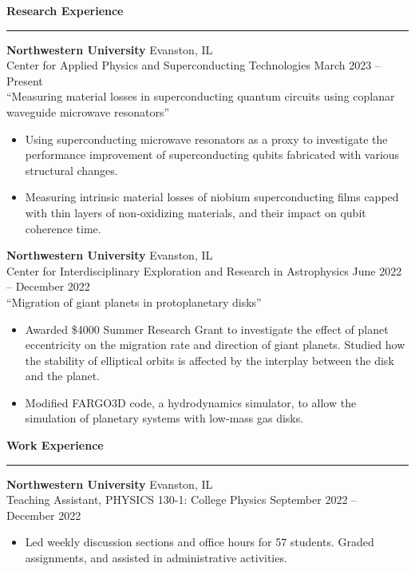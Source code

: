 \documentclass{article}
\begin{document}
\large \textbf{Research Experience}
\vspace{0.2\baselineskip}
\hrule\normalsize
\textbf{Northwestern University} \hfill Evanston, IL \\
Center for Applied Physics and Superconducting Technologies \hfill March 2023 – Present\\
“Measuring material losses in superconducting quantum circuits using coplanar waveguide microwave resonators”
\begin{itemize}[leftmargin=*]
    \item Using superconducting microwave resonators as a proxy to investigate the performance improvement of superconducting qubits fabricated with various structural changes.
    \item Measuring intrinsic material losses of niobium superconducting films capped with thin layers of non-oxidizing materials, and their impact on qubit coherence time.
\end{itemize}
\textbf{Northwestern University} \hfill Evanston, IL \\
Center for Interdisciplinary Exploration and Research in Astrophysics \hfill June 2022 – December 2022\\
“Migration of giant planets in protoplanetary disks”
\begin{itemize}[leftmargin=*]
    \item Awarded \$4000 Summer Research Grant to investigate the effect of planet eccentricity on the migration rate and direction of giant planets. Studied how the stability of elliptical orbits is affected by the interplay between the disk and the planet. 
    \item Modified FARGO3D code, a hydrodynamics simulator, to allow the simulation of planetary systems with low-mass gas disks.
\end{itemize}


\large \textbf{Work Experience}
\vspace{0.2\baselineskip}
\hrule\normalsize
\textbf{Northwestern University} \hfill Evanston, IL \\
Teaching Assistant, PHYSICS 130-1: College Physics \hfill September 2022 – December 2022
\begin{itemize}[leftmargin=*]
    \item Led weekly discussion sections and office hours for 57 students. Graded assignments, and assisted in administrative activities.
\end{itemize}
\end{document}
